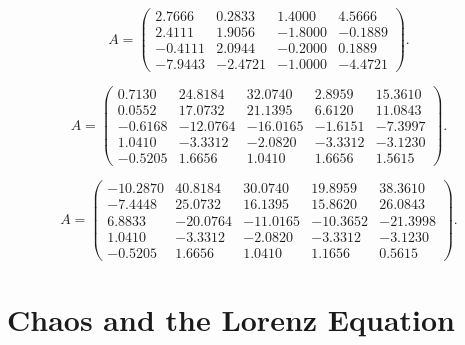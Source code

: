 \documentclass{ximera}
\begin{document}
\begin{exercise} \label{c14.5.2b}
\begin{equation*}
A=\left(\begin{array}{rrrr}
    2.7666  &  0.2833  &  1.4000  &  4.5666\\
    2.4111  &  1.9056  & -1.8000  & -0.1889\\
   -0.4111  &  2.0944  & -0.2000  &  0.1889\\
   -7.9443  & -2.4721  & -1.0000  & -4.4721
\end{array}\right).
\end{equation*}
\end{exercise}

\begin{exercise} \label{c14.5.2c}
\begin{equation*}
A=\left(\begin{array}{rrrrr}
    0.7130  & 24.8184  & 32.0740  &  2.8959  & 15.3610\\
    0.0552  & 17.0732  & 21.1395  &  6.6120  & 11.0843\\
   -0.6168  &-12.0764  &-16.0165  & -1.6151  & -7.3997\\
    1.0410  & -3.3312  & -2.0820  & -3.3312  & -3.1230\\
   -0.5205  &  1.6656  &  1.0410  &  1.6656  &  1.5615
\end{array}\right).
\end{equation*}
\end{exercise}

\begin{exercise} \label{c14.5.2d}
\begin{equation*}
A=\left(\begin{array}{rrrrr}
  -10.2870 &  40.8184 &  30.0740 &  19.8959 &  38.3610\\
   -7.4448 &  25.0732 &  16.1395 &  15.8620 &  26.0843\\
    6.8833 & -20.0764 & -11.0165 & -10.3652 & -21.3998\\
    1.0410 &  -3.3312 &  -2.0820 &  -3.3312 &  -3.1230\\
   -0.5205 &   1.6656 &   1.0410 &   1.1656 &   0.5615
\end{array}\right).
\end{equation*}
\end{exercise}


\section{Chaos and the Lorenz Equation}
\label{S:chaos} 
\end{document}

